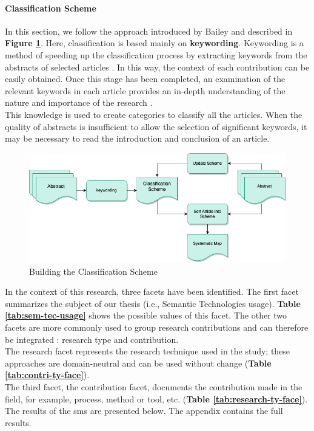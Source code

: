             
            \paragraph{Classification Scheme}
            In this section, we follow the approach introduced by Bailey \cite{hill2019systematic} and described in \textbf{Figure \ref{fig:BuildClassSchem}}. Here, classification is based mainly on \textbf{keywording}. Keywording is a method of speeding up the classification process by extracting keywords from the abstracts of selected articles \cite{petersen2008systematic}. In this way, the context of each contribution can be easily obtained. Once this stage has been completed, an examination of the relevant keywords in each article provides an in-depth understanding of the nature and importance of the research \cite{petersen2008systematic}. \\
            This knowledge is used to create categories to classify all the articles. When the quality of abstracts is insufficient to allow the selection of significant keywords, it may be necessary to read the introduction and conclusion of an article.

            \begin{figure}[h]
                \centering
                \includegraphics[scale=0.6]{images/RelatedWork-Build-Class-Schem.drawio.png}  
                \caption[Building the Classification Scheme]{\label{fig:BuildClassSchem}  Building the Classification Scheme \cite{petersen2008systematic}}
            \end{figure}

           In the context of this research, three facets have been identified. The first facet summarizes the subject of our thesis (i.e., Semantic Technologies usage). \textbf{Table \ref{tab:sem-tec-usage}} shows the possible values of this facet. The other two facets are more commonly used to group research contributions and can therefore be integrated \cite{petersen2008systematic, wieringa2006requirements}: research type and contribution.\\
            The research facet represents the research technique used in the study; these approaches are domain-neutral and can be used without change (\textbf{Table \ref{tab:contri-ty-face}}).\\
            The third facet, the contribution facet, documents the contribution made in the field, for example, process, method or tool, etc. (\textbf{Table \ref{tab:research-ty-face}}).\\
            The results of the \acrshort{sms} are presented below. The appendix contains the full results.

